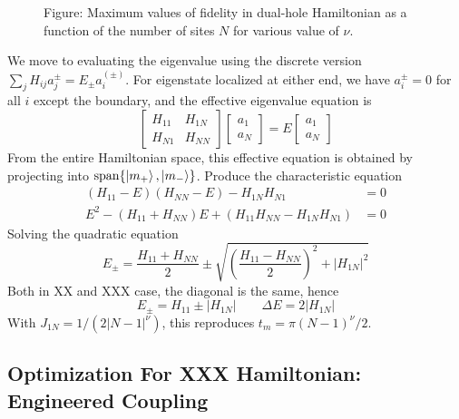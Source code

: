 \documentclass[../../../main.tex]{subfiles}
\begin{document}
\begin{figure}
    \centering
    \resizebox{\textwidth}{!}{}
    \caption*{Figure: Maximum values of fidelity in dual-hole Hamiltonian as a function of the number of sites $N$ for various value of $\nu$.}
\end{figure}

We move to evaluating the eigenvalue using the discrete version $\textstyle\sum_{j} H_{ij}a_j^{\pm} = E_\pm a_i^{(\pm)}$.
For eigenstate localized at either end, we have $a^\pm_i=0$ for all $i$ except the boundary, and the effective eigenvalue equation is
\begin{equation*}
    \begin{bmatrix}
H_{11} & H_{1N}\\
H_{N1} & H_{NN}
\end{bmatrix}
\begin{bmatrix}
a_1\\
a_N
\end{bmatrix}
=
E
\begin{bmatrix}
a_1\\
a_N
\end{bmatrix}
\end{equation*}
From the entire Hamiltonian space, this effective equation is obtained by projecting into $\mathrm{span} \{\ket{m_+},\ket{m_-}\}$.
Produce the characteristic equation
\begin{align*}
    (H_{11}-E)(H_{NN}-E)-H_{1N}H_{N1}& =  0\\
    E^2-(H_{11}+H_{NN})E+\left(H_{11}H_{NN}-H_{1N}H_{N1}\right)& =  0
\end{align*}
Solving the quadratic equation
\begin{equation*}
    E_\pm=
    \frac{H_{11}+H_{NN}}{2}\pm\sqrt{\left(\frac{H_{11}-H_{NN}}{2}\right)^2+|H_{1N}|^2}
\end{equation*}
Both in XX and XXX case, the diagonal is the same, hence
\begin{equation*}
    E_\pm = H_{11} \pm |H_{1N}|\qquad
    \Delta E = 2|H_{1N}|
\end{equation*}
With $J_{1N} = 1/(2|N-1|^\nu)$, this reproduces $t_m = \pi(N-1)^\nu/2$.

\subsection{Optimization For XXX Hamiltonian: Engineered Coupling}
\end{document}
